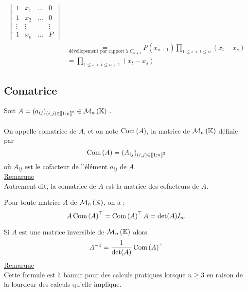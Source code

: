 \begin{dem}
\begin{itemize}
\begin{align*}
\begin{vmatrix}
            1 & x_1 & \dots & 0\\
            1 & x_2 & \dots & 0\\
            \vdots & \vdots &&\vdots \\
            1 & x_n &\dots & P
            \end{vmatrix}\\
            &\underset{\text{dévellopement par rapport à }C_{n+1}}{=} P(x_{n+1}) \prod_{1\leq s<t\leq n}(x_t - x_s) \\
            &= \prod_{1\leq s<t\leq n+1}(x_t - x_s)
        \end{align*}
    \end{itemize}
\end{dem}

\subsection{Comatrice}
\begin{defi}
    Soit \(A = (a_{ij} )_{(i,j)\in \interventierii{1}{n}^2} \in  \M{n}\) .\\~\\
    On appelle comatrice de \(A\), et on note \(\operatorname{Com}\left(A\right)\), la matrice de \(\M{n}\) définie par 
    \[\operatorname{Com}\left(A\right) = (A_{ij} )_{(i,j) \in \left\llbracket1;n\right\rrbracket^2}\]
    où \(A_{ij}\) est le cofacteur de l’élément \(a_{ij}\) de \(A\).\\
    \underline{Remarque}\\
    Autrement dit, la comatrice de \(A\) est la matrice des cofacteurs de \(A\).
\end{defi}

\begin{defprop}
    Pour toute matrice \(A\) de \(\M{n}\), on a :
    \[A \operatorname{Com}\left(A\right)^{\top} = \operatorname{Com}\left(A\right)^{\top} A = \det (A)I_n.\]
\end{defprop}
\begin{defprop}
    Si \(A\) est une matrice inversible de \(\M{n}\) alors
    \[A^{-1} = \frac{1}{\det (A)} \operatorname{Com}\left(A\right)^{\top} \]
    \underline{Remarque}\\
    Cette formule est à bannir pour des calculs pratiques lorsque \(n \geq 3\) en raison de la lourdeur des calculs qu’elle implique.
\end{defprop}